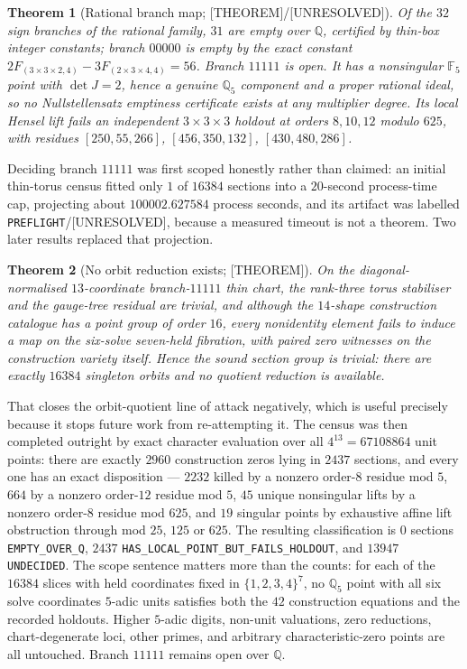 \documentclass[11pt]{article}
\newtheorem{theorem}{Theorem}[section]
\theoremstyle{definition}
\newcommand{\Qb}{\mathbb{Q}}
\newcommand{\Fb}{\mathbb{F}}
\begin{document}
\begin{theorem}[Rational branch map; {[THEOREM]}/{[UNRESOLVED]}]\label{thm:kwbranch}
Of the $32$ sign branches of the rational family, $31$ are empty over $\Qb$, certified by thin-box
integer constants; branch $00000$ is empty by the exact constant $2F_{(3\times3\times2,4)}-
3F_{(2\times3\times4,4)}=56$. Branch $11111$ is open. It has a nonsingular $\Fb_5$ point with
$\det J=2$, hence a genuine $\Qb_5$ component and a proper rational ideal, so \emph{no}
Nullstellensatz emptiness certificate exists at any multiplier degree. Its local Hensel lift fails an
independent $3\times3\times3$ holdout at orders $8,10,12$ modulo $625$, with residues
$[250,55,266]$, $[456,350,132]$, $[430,480,286]$.
\end{theorem}

Deciding branch $11111$ was first scoped honestly rather than claimed: an initial thin-torus census
fitted only $1$ of $16384$ sections into a $20$-second process-time cap, projecting about
$100002.627584$ process seconds, and its artifact was labelled \texttt{PREFLIGHT}/[UNRESOLVED],
because a measured timeout is not a theorem. Two later results replaced that projection.

\begin{theorem}[No orbit reduction exists; {[THEOREM]}]\label{thm:kwquot}
On the diagonal-normalised $13$-coordinate branch-$11111$ thin chart, the rank-three torus stabiliser
and the gauge-tree residual are trivial, and although the $14$-shape construction catalogue has a
point group of order $16$, every nonidentity element fails to induce a map on the six-solve
seven-held fibration, with paired zero witnesses on the construction variety itself. Hence the sound
section group is trivial: there are exactly $16384$ singleton orbits and no quotient reduction is
available.
\end{theorem}

That closes the orbit-quotient line of attack negatively, which is useful precisely because it stops
future work from re-attempting it. The census was then completed outright by exact character
evaluation over all $4^{13}=67108864$ unit points: there are exactly $2960$ construction zeros lying
in $2437$ sections, and every one has an exact disposition --- $2232$ killed by a nonzero order-$8$
residue mod $5$, $664$ by a nonzero order-$12$ residue mod $5$, $45$ unique nonsingular lifts by a
nonzero order-$8$ residue mod $625$, and $19$ singular points by exhaustive affine lift obstruction
through mod $25$, $125$ or $625$. The resulting classification is
$0$ sections \texttt{EMPTY\_OVER\_Q}, $2437$ \texttt{HAS\_LOCAL\_POINT\_BUT\_FAILS\_HOLDOUT}, and
$13947$ \texttt{UNDECIDED}. The scope sentence matters more than the counts: for each of the $16384$
slices with held coordinates fixed in $\{1,2,3,4\}^7$, no $\Qb_5$ point with all six solve coordinates
$5$-adic units satisfies both the $42$ construction equations and the recorded holdouts. Higher
$5$-adic digits, non-unit valuations, zero reductions, chart-degenerate loci, other primes, and
arbitrary characteristic-zero points are all untouched. Branch $11111$ remains open over $\Qb$.
\end{document}
